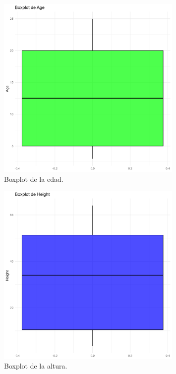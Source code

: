 \documentclass{article}
\begin{document}
\begin{figure}[htbp]
    \centering
    \includegraphics[width=0.8\textwidth]{boxplot_age.png}
    \caption{Boxplot de la edad.}
\end{figure}

\begin{figure}[htbp]
    \centering
    \includegraphics[width=0.8\textwidth]{boxplot_height.png}
    \caption{Boxplot de la altura.}
\end{figure}
\end{document}
